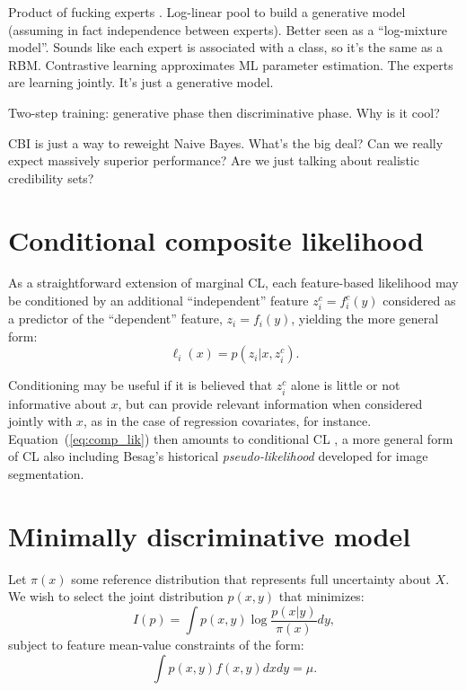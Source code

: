\documentclass[english]{scrartcl}
\begin{document}
{\color{red}Product of fucking experts \cite{Hinton-02}. Log-linear pool to build a generative model (assuming in fact independence between experts). Better seen as a ``log-mixture model''. Sounds like each expert is associated with a class, so it's the same as a RBM. Contrastive learning approximates ML parameter estimation. The experts are learning jointly. It's just a generative model.}

{\color{red}Two-step training: generative phase then discriminative phase. Why is it cool?}

{\color{red}CBI is just a way to reweight Naive Bayes. What's the big deal? Can we really expect massively superior performance? Are we just talking about realistic credibility sets?}


\appendix

\section{Conditional composite likelihood}
\label{sec:conditional}

As a straightforward  extension of marginal CL, each feature-based likelihood may be conditioned by an additional ``independent'' feature $z^c_i = f^c_i(y)$ considered as a predictor of the ``dependent'' feature, $z_i=f_i(y)$, yielding the more general form:
\begin{equation}
\label{eq:cond_feat_lik}
\ell_i(x) = p(z_i|x,z^c_i).
\end{equation}

Conditioning may be useful if it is believed that $z^c_i$ alone is little or not informative about $x$, but can provide relevant information when considered jointly with $x$, as in the case of regression covariates, for instance. Equation~(\ref{eq:comp_lik}) then amounts to conditional CL \cite{Varin-11}, a more general form of CL also including Besag's historical {\em pseudo-likelihood} \cite{Besag-74} developed for image segmentation.


\section{Minimally discriminative model}

Let $\pi(x)$ some reference distribution that represents full
uncertainty about $X$. We wish to select the joint distribution
$p(x,y)$ that minimizes:
$$
I(p) = \int p(x,y) \log \frac{p(x|y)}{\pi(x)} dy,
$$ subject to feature mean-value constraints of the form:
$$
\int p(x,y) f(x,y) dx dy = \mu.
$$
\end{document}
